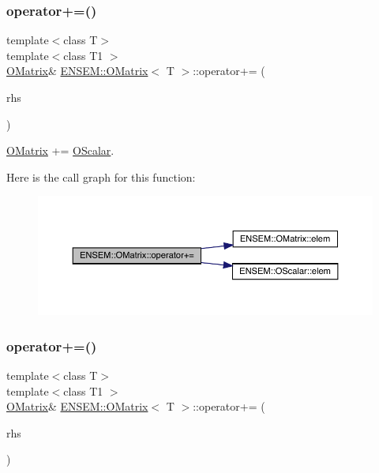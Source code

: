 \subsubsection{\texorpdfstring{operator+=()}{operator+=()}\hspace{0.1cm}{\footnotesize\ttfamily [3/4]}}
{\footnotesize\ttfamily template$<$class T$>$ \\
template$<$class T1 $>$ \\
\mbox{\hyperlink{classENSEM_1_1OMatrix}{O\+Matrix}}\& \mbox{\hyperlink{classENSEM_1_1OMatrix}{E\+N\+S\+E\+M\+::\+O\+Matrix}}$<$ T $>$\+::operator+= (\begin{DoxyParamCaption}\item[{const \mbox{\hyperlink{classENSEM_1_1OScalar}{O\+Scalar}}$<$ T1 $>$ \&}]{rhs }\end{DoxyParamCaption})\hspace{0.3cm}{\ttfamily [inline]}}



\mbox{\hyperlink{classENSEM_1_1OMatrix}{O\+Matrix}} += \mbox{\hyperlink{classENSEM_1_1OScalar}{O\+Scalar}}. 

Here is the call graph for this function\+:
\nopagebreak
\begin{figure}[H]
\begin{center}
\leavevmode
\includegraphics[width=350pt]{dd/d80/classENSEM_1_1OMatrix_ab488697fd72f3891fede3d00f8deb019_cgraph}
\end{center}
\end{figure}
\mbox{\label{classENSEM_1_1OMatrix_ab488697fd72f3891fede3d00f8deb019}} 
\subsubsection{\texorpdfstring{operator+=()}{operator+=()}\hspace{0.1cm}{\footnotesize\ttfamily [4/4]}}
{\footnotesize\ttfamily template$<$class T$>$ \\
template$<$class T1 $>$ \\
\mbox{\hyperlink{classENSEM_1_1OMatrix}{O\+Matrix}}\& \mbox{\hyperlink{classENSEM_1_1OMatrix}{E\+N\+S\+E\+M\+::\+O\+Matrix}}$<$ T $>$\+::operator+= (\begin{DoxyParamCaption}\item[{const \mbox{\hyperlink{classENSEM_1_1OScalar}{O\+Scalar}}$<$ T1 $>$ \&}]{rhs }\end{DoxyParamCaption})\hspace{0.3cm}{\ttfamily [inline]}}



